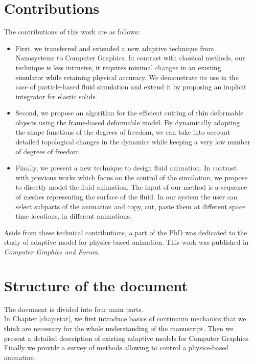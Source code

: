 \section{Contributions}
The contributions of this work are as follows:
\begin{itemize}
    \item First, we transferred and extended a new adaptive technique from Nanosystems to Computer Graphics. In contrast with classical methods, our technique is less intrusive, it requires minimal changes in an existing simulator while retaining physical accuracy. We demonstrate its use in the case of particle-based fluid simulation and extend it by proposing an implicit integrator for elastic solids.
    \item Second, we propose an algorithm for the efficient cutting of thin deformable objects using the frame-based deformable model. By dynamically adapting the shape functions of the degrees of freedom, we can take into account detailed topological changes in the dynamics while keeping a very low number of degrees of freedom.
    \item Finally, we present a new technique to design fluid animation. In contrast with previous works which focus on the control of the simulation, we propose to directly model the fluid animation. The input of our method is a sequence of meshes representing the surface of the fluid. In our system the user can select subparts of the animation and copy, cut, paste them at different space time locations, in different animations.
\end{itemize}

Aside from these technical contributions, a part of the PhD was dedicated to the study of adaptive model for physics-based animation. This work was published in \emph{Computer Graphics and Forum.}

\section{Structure of the document}
The document is divided into four main parts. \\

In Chapter \ref{chap:star}, we first introduce basics of continuum mechanics that we think are necessary for the whole understanding of the manuscript. Then we present a detailed description of existing adaptive models for Computer Graphics. Finally we provide a survey of methods allowing to control a physics-based animation. \\

